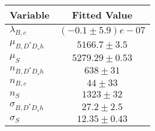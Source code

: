 \begin{tabular}[t]{lc}
\hline
Variable &Fitted Value\\
\hline\hline
$\lambda_{B,c}$&$(-0.1\pm5.9)e-07$\\
\hline
$\mu_{B, D^* D_s h}$&$5166.7\pm3.5$\\
\hline
$\mu_S$&$5279.29\pm0.53$\\
\hline
$n_{B, D^* D_s h}$&$638\pm31$\\
\hline
$n_{B,c}$&$44\pm33$\\
\hline
$n_S$&$1323\pm32$\\
\hline
$\sigma_{B, D^* D_s h}$&$27.2\pm2.5$\\
\hline
$\sigma_S$&$12.35\pm0.43$\\
\hline
\end{tabular}
